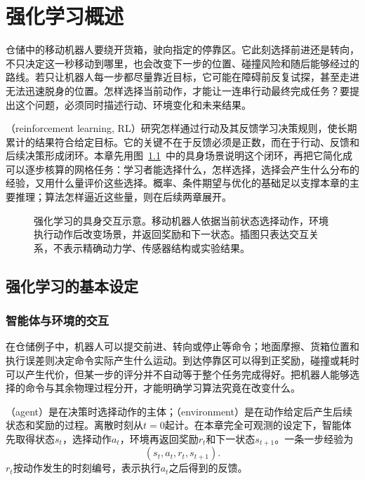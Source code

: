 \chapter{强化学习概述}
\label{chap:rl-overview}

仓储中的移动机器人要绕开货箱，驶向指定的停靠区。它此刻选择前进还是转向，不只决定这一秒移动到哪里，也会改变下一步的位置、碰撞风险和随后能够经过的路线。若只让机器人每一步都尽量靠近目标，它可能在障碍前反复试探，甚至走进无法迅速脱身的位置。怎样选择当前动作，才能让一连串行动最终完成任务？要提出这个问题，必须同时描述行动、环境变化和未来结果。

（reinforcement learning, RL）研究怎样通过行动及其反馈学习决策规则，使长期累计的结果符合给定目标。它的关键不在于反馈必须是正数，而在于行动、反馈和后续决策形成闭环。本章先用图~\ref{fig:rl-overview-embodied-setting}~中的具身场景说明这个闭环，再把它简化成可以逐步核算的网格任务：学习者能选择什么，怎样选择，选择会产生什么分布的经验，又用什么量评价这些选择。概率、条件期望与优化的基础足以支撑本章的主要推理；算法怎样逼近这些量，则在后续两章展开。

\begin{figure}[htbp]
  \centering
  
  \caption{强化学习的具身交互示意。移动机器人依据当前状态选择动作，环境执行动作后改变场景，并返回奖励和下一状态。插图只表达交互关系，不表示精确动力学、传感器结构或实验结果。}
  \label{fig:rl-overview-embodied-setting}
\end{figure}

\section{强化学习的基本设定}
\label{sec:rl-overview-setting}

\subsection{智能体与环境的交互}
\label{sec:rl-overview-interaction}

在仓储例子中，机器人可以提交前进、转向或停止等命令；地面摩擦、货箱位置和执行误差则决定命令实际产生什么运动。到达停靠区可以得到正奖励，碰撞或耗时可以产生代价，但某一步的评分并不自动等于整个任务完成得好。把机器人能够选择的命令与其余物理过程分开，才能明确学习算法究竟在改变什么。

\begin{definition}
  \label{def:rl-overview-interface}
  （agent）是在决策时选择动作的主体；（environment）是在动作给定后产生后续状态和奖励的过程。离散时刻从$t=0$起计。在本章完全可观测的设定下，智能体先取得状态$s_t$，选择动作$a_t$，环境再返回奖励$r_t$和下一状态$s_{t+1}$。一条一步经验为
  \[
    (s_t,a_t,r_t,s_{t+1}).
  \]
  $r_t$按动作发生的时刻编号，表示执行$a_t$之后得到的反馈。
\end{definition}

